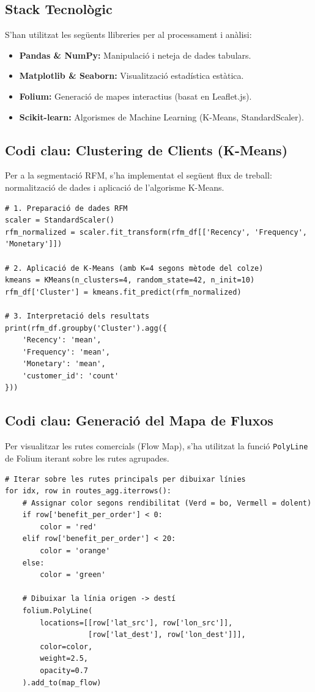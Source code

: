 \documentclass[12pt,a4paper]{article}
\begin{document}
\subsection{Stack Tecnològic}
S'han utilitzat les següents llibreries per al processament i anàlisi:
\begin{itemize}
    \item \textbf{Pandas \& NumPy:} Manipulació i neteja de dades tabulars.
    \item \textbf{Matplotlib \& Seaborn:} Visualització estadística estàtica.
    \item \textbf{Folium:} Generació de mapes interactius (basat en Leaflet.js).
    \item \textbf{Scikit-learn:} Algorismes de Machine Learning (K-Means, StandardScaler).
\end{itemize}

\subsection{Codi clau: Clustering de Clients (K-Means)}
Per a la segmentació RFM, s'ha implementat el següent flux de treball: normalització de dades i aplicació de l'algorisme K-Means.

\begin{verbatim}
# 1. Preparació de dades RFM
scaler = StandardScaler()
rfm_normalized = scaler.fit_transform(rfm_df[['Recency', 'Frequency', 'Monetary']])

# 2. Aplicació de K-Means (amb K=4 segons mètode del colze)
kmeans = KMeans(n_clusters=4, random_state=42, n_init=10)
rfm_df['Cluster'] = kmeans.fit_predict(rfm_normalized)

# 3. Interpretació dels resultats
print(rfm_df.groupby('Cluster').agg({
    'Recency': 'mean',
    'Frequency': 'mean',
    'Monetary': 'mean',
    'customer_id': 'count'
}))
\end{verbatim}

\subsection{Codi clau: Generació del Mapa de Fluxos}
Per visualitzar les rutes comercials (Flow Map), s'ha utilitzat la funció \texttt{PolyLine} de Folium iterant sobre les rutes agrupades.

\begin{verbatim}
# Iterar sobre les rutes principals per dibuixar línies
for idx, row in routes_agg.iterrows():
    # Assignar color segons rendibilitat (Verd = bo, Vermell = dolent)
    if row['benefit_per_order'] < 0:
        color = 'red'
    elif row['benefit_per_order'] < 20:
        color = 'orange'
    else:
        color = 'green'
    
    # Dibuixar la línia origen -> destí
    folium.PolyLine(
        locations=[[row['lat_src'], row['lon_src']], 
                   [row['lat_dest'], row['lon_dest']]],
        color=color,
        weight=2.5,
        opacity=0.7
    ).add_to(map_flow)
\end{verbatim}
\end{document}
